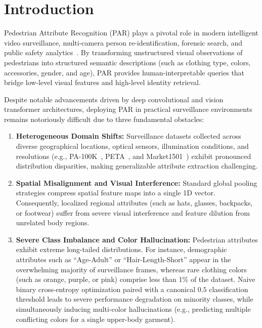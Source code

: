 \section{Introduction}
\label{sec:intro}

Pedestrian Attribute Recognition (PAR) plays a pivotal role in modern intelligent video surveillance, multi-camera person re-identification, forensic search, and public safety analytics~\cite{specker2023upar,cormier2023upar,liu2017hydraplus}. By transforming unstructured visual observations of pedestrians into structured semantic descriptions (such as clothing type, colors, accessories, gender, and age), PAR provides human-interpretable queries that bridge low-level visual features and high-level identity retrieval.

Despite notable advancements driven by deep convolutional and vision transformer architectures, deploying PAR in practical surveillance environments remains notoriously difficult due to three fundamental obstacles:
\begin{enumerate}
    \item \textbf{Heterogeneous Domain Shifts:} Surveillance datasets collected across diverse geographical locations, optical sensors, illumination conditions, and resolutions (e.g., PA-100K~\cite{liu2017hydraplus}, PETA~\cite{deng2014pedestrian}, and Market1501~\cite{zheng2015scalable}) exhibit pronounced distribution disparities, making generalizable attribute extraction challenging.
    \item \textbf{Spatial Misalignment and Visual Interference:} Standard global pooling strategies compress spatial feature maps into a single 1D vector. Consequently, localized regional attributes (such as hats, glasses, backpacks, or footwear) suffer from severe visual interference and feature dilution from unrelated body regions.
    \item \textbf{Severe Class Imbalance and Color Hallucination:} Pedestrian attributes exhibit extreme long-tailed distributions. For instance, demographic attributes such as ``Age-Adult'' or ``Hair-Length-Short'' appear in the overwhelming majority of surveillance frames, whereas rare clothing colors (such as orange, purple, or pink) comprise less than 1\% of the dataset. Naive binary cross-entropy optimization paired with a canonical $0.5$ classification threshold leads to severe performance degradation on minority classes, while simultaneously inducing multi-color hallucinations (e.g., predicting multiple conflicting colors for a single upper-body garment).
\end{enumerate}

